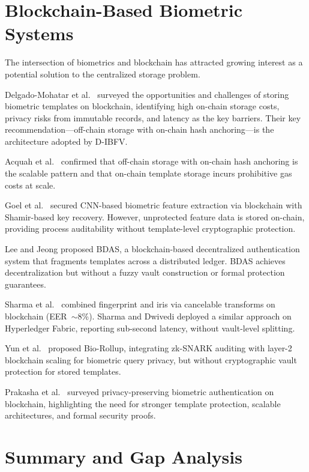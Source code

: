 \section{Blockchain-Based Biometric Systems}
\label{sec:blockchain_related}

The intersection of biometrics and blockchain has attracted growing interest as a
potential solution to the centralized storage problem.

Delgado-Mohatar et al.\ \cite{delgado2020blockchain} surveyed the opportunities
and challenges of storing biometric templates on blockchain, identifying high
on-chain storage costs, privacy risks from immutable records, and latency as the
key barriers. Their key recommendation---off-chain storage with on-chain hash
anchoring---is the architecture adopted by D-IBFV.

Acquah et al.\ \cite{acquah2020securing} confirmed that off-chain storage with
on-chain hash anchoring is the scalable pattern and that on-chain template storage
incurs prohibitive gas costs at scale.

Goel et al.\ \cite{goel2019securing} secured CNN-based biometric feature extraction
via blockchain with Shamir-based key recovery. However, unprotected feature data
is stored on-chain, providing process auditability without template-level
cryptographic protection.

Lee and Jeong \cite{lee2021securing} proposed BDAS, a blockchain-based
decentralized authentication system that fragments templates across a distributed
ledger. BDAS achieves decentralization but without a fuzzy vault construction or
formal protection guarantees.

Sharma et al.\ \cite{sharma2024multimodal} combined fingerprint and iris via
cancelable transforms on blockchain (EER~$\sim$8\%). Sharma and Dwivedi
\cite{sharma2026fabric} deployed a similar approach on Hyperledger Fabric, reporting
sub-second latency, without vault-level splitting.

Yun et al.\ \cite{yun2024biorollup} proposed Bio-Rollup, integrating zk-SNARK
auditing with layer-2 blockchain scaling for biometric query privacy, but without
cryptographic vault protection for stored templates.

Prakasha et al.\ \cite{prakasha2025privacy} surveyed privacy-preserving biometric
authentication on blockchain, highlighting the need for stronger template protection,
scalable architectures, and formal security proofs.

\section{Summary and Gap Analysis}


